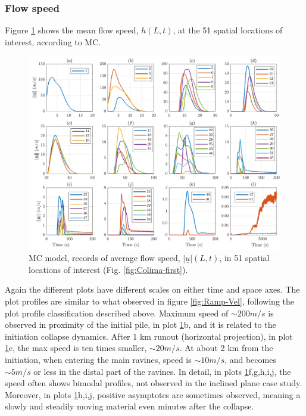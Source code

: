 \documentclass{article}
\begin{document}
\subsubsection{Flow speed}
Figure \ref{fig:BAF-V-MC} shows the mean flow speed, $h(L,t)$, at the 51 spatial locations of interest, according to MC.
\begin{figure}[H]
         \centering
        \includegraphics[width=1\textwidth]{MC&VS_51/Velocity_MC3.png}
        \caption{MC model, records of average flow speed, $\vert\underline{u}\vert(L,t)$, in 51 spatial locations of interest (Fig. \ref{fig:Colima-first}).}
        \label{fig:BAF-V-MC}
\end{figure}
Again the different plots have different scales on either time and space axes. The plot profiles are similar to what observed in figure \ref{fig:Ramp-Vel}, following the plot profile classification described above. Maximum speed of $\sim 200 m/s$ is observed in proximity of the initial pile, in plot \ref{fig:BAF-V-MC}b, and it is related to the initiation collapse dynamics. After 1 km runout (horizontal projection), in plot \ref{fig:BAF-V-MC}e, the max speed is ten times smaller, $\sim 20 m/s$. At about 2 km from the initiation, when entering the main ravines, speed is $\sim 10 m/s$, and becomes $\sim 5 m/s$ or less in the distal part of the ravines.  In detail, in plots  \ref{fig:BAF-V-MC}f,g,h,i,j, the speed often shows bimodal profiles, not observed in the inclined plane case study. Moreover, in plots \ref{fig:BAF-V-MC}h,i,j, positive asymptotes are sometimes observed, meaning a slowly and steadily moving material even minutes after the collapse.
\end{document}
